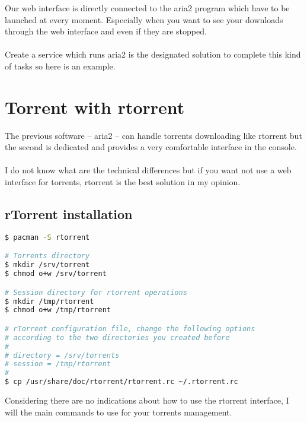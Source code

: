 Our web interface is directly connected to the aria2 program which have to be 
launched at every moment. Especially when you want to see your downloads through 
the web interface and even if they are stopped.
\\\\
Create a service which runs aria2 is the designated solution to complete this 
kind of tasks so here is an example.

\lstset{language=bash,caption=Run aria2 as a service}


\section{Torrent with rtorrent}

The previous software -- aria2 -- can handle torrents downloading like rtorrent 
but the second is dedicated and provides a very comfortable interface in the 
console. 
\\\\
I do not know what are the technical differences but if you want not 
use a web interface for torrents, rtorrent is the best solution in my opinion.

\subsection{rTorrent installation}
\begin{lstlisting}[language=bash,caption=rTorrent installation]
$ pacman -S rtorrent

# Torrents directory
$ mkdir /srv/torrent
$ chmod o+w /srv/torrent

# Session directory for rtorrent operations
$ mkdir /tmp/rtorrent
$ chmod o+w /tmp/rtorrent

# rTorrent configuration file, change the following options
# according to the two directories you created before
#
# directory = /srv/torrents
# session = /tmp/rtorrent
#
$ cp /usr/share/doc/rtorrent/rtorrent.rc ~/.rtorrent.rc
\end{lstlisting}

Considering there are no indications about how to use the rtorrent interface, I 
will the main commands to use for your torrents management.

